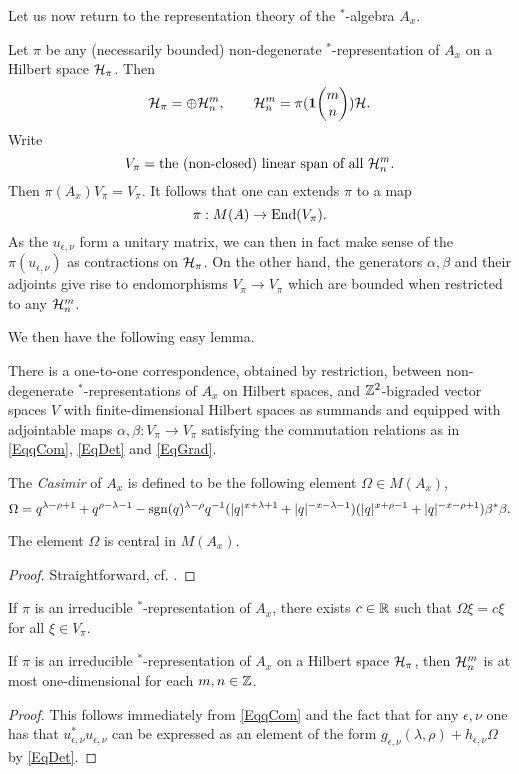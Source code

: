 Let us now return to the representation theory of the $^*$-algebra $A_x$.

Let $\pi$ be any (necessarily bounded) non-degenerate $^*$-representation of $A_x$ on a Hilbert space $\mathcal{H}_{\pi}$. Then \[\mathcal{H}_{\pi} = \oplus \mathcal{H}^{m}_{n},\qquad \mathcal{H}^{m}_{n} = \pi(\mathbf{1}\!\begin{pmatrix} m \\ n\end{pmatrix})\mathcal{H}.\] Write \[V_{\pi} =  \textrm{the (non-closed) linear span of all }\mathcal{H}^{m}_{n}.\] Then $\pi(A_x)V_{\pi} = V_{\pi}$. It follows that one can extends $\pi$ to a map \[\pi: M(A) \rightarrow \operatorname{\mathrm{End}}(V_{\pi}).\] As the $u_{\epsilon,\nu}$ form a unitary matrix, we can then in fact make sense of the $\pi(u_{\epsilon,\nu})$ as contractions on $\mathcal{H}_{\pi}$. On the other hand, the generators $\alpha,\beta$ and their adjoints give rise to endomorphisms $V_{\pi}\rightarrow V_{\pi}$ which are bounded when restricted to any $\mathcal{H}^{m}_{n}$.

We then have the following easy lemma.

\begin{Lem} There is a one-to-one correspondence, obtained by restriction, between non-degenerate $^*$-representations of $A_x$ on Hilbert spaces, and $\mathbb{Z}^2$-bigraded vector spaces $V$ with finite-dimensional Hilbert spaces as summands and equipped with adjointable maps $\alpha,\beta:V_{\pi}\rightarrow V_{\pi}$ satisfying the commutation relations as in \eqref{EqqCom}, \eqref{EqDet} and \eqref{EqGrad}.\end{Lem}

\begin{Def} The \emph{Casimir} of $A_x$ is defined to be the following element $\Omega\in M(A_x)$, \[\Omega =q^{\lambda-\rho+1}+q^{\rho-\lambda-1} - \operatorname{\mathrm{sgn}}(q)^{\lambda-\rho}q^{-1}(|q|^{x+\lambda+1}+|q|^{-x-\lambda-1})(|q|^{x+\rho-1}+|q|^{-x-\rho+1})\beta^*\beta.\] 
\end{Def}

\begin{Lem} The element $\Omega$ is central in $M(A_x)$.
\end{Lem}
\begin{proof}
Straightforward, cf. \cite[Lemma 3.3]{KoR1}.
\end{proof}

\begin{Cor} If $\pi$ is an irreducible $^*$-representation of $A_x$, there exists $c\in \mathbb{R}$ such that $\Omega\xi = c\xi$ for all $\xi \in V_{\pi}$. 
\end{Cor} 
\begin{Cor} If $\pi$ is an irreducible $^*$-representation of $A_x$ on a Hilbert space $\mathcal{H}_{\pi}$, then $\mathcal{H}^m_n$ is at most one-dimensional for each $m,n\in \mathbb{Z}$.
\end{Cor} 
\begin{proof} 
This follows immediately from \eqref{EqqCom} and the fact that for any $\epsilon,\nu$ one has that $u_{\epsilon,\nu}^*u_{\epsilon,\nu}$ can be expressed as an element of the form $g_{\epsilon,\nu}(\lambda,\rho) + h_{\epsilon,\nu}\Omega$ by \eqref{EqDet}.
\end{proof}

